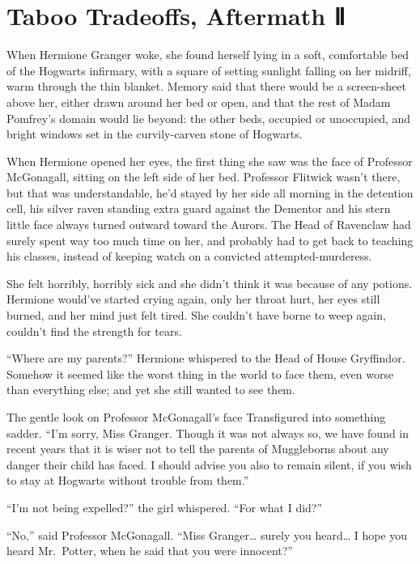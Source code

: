 \chapter{Taboo Tradeoffs, Aftermath Ⅱ}

When Hermione Granger woke, she found herself lying in a soft,
comfortable bed of the Hogwarts infirmary, with a square of setting
sunlight falling on her midriff, warm through the thin blanket. Memory
said that there would be a screen-sheet above her, either drawn around
her bed or open, and that the rest of Madam Pomfrey's domain would lie
beyond: the other beds, occupied or unoccupied, and bright windows set
in the curvily-carven stone of Hogwarts.

When Hermione opened her eyes, the first thing she saw was the face of
Professor McGonagall, sitting on the left side of her bed. Professor
Flitwick wasn't there, but that was understandable, he'd stayed by her
side all morning in the detention cell, his silver raven standing extra
guard against the Dementor and his stern little face always turned
outward toward the Aurors. The Head of Ravenclaw had surely spent way
too much time on her, and probably had to get back to teaching his
classes, instead of keeping watch on a convicted attempted-murderess.

She felt horribly, horribly sick and she didn't think it was because of
any potions. Hermione would've started crying again, only her throat
hurt, her eyes still burned, and her mind just felt tired. She couldn't
have borne to weep again, couldn't find the strength for tears.

``Where are my parents?'' Hermione whispered to the Head of House
Gryffindor. Somehow it seemed like the worst thing in the world to face
them, even worse than everything else; and yet she still wanted to see
them.

The gentle look on Professor McGonagall's face Transfigured into
something sadder. ``I'm sorry, Miss Granger. Though it was not always
so, we have found in recent years that it is wiser not to tell the
parents of Muggleborns about any danger their child has faced. I should
advise you also to remain silent, if you wish to stay at Hogwarts
without trouble from them.''

``I'm not being expelled?'' the girl whispered. ``For what I did?''

``No,'' said Professor McGonagall. ``Miss Granger\ldots{} surely you
heard\ldots{} I hope you heard Mr.~Potter, when he said that you were
innocent?''

